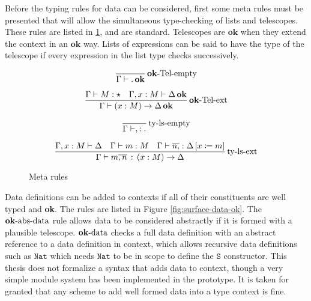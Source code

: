 Before the typing rules for data can be considered, first some meta rules must be presented that will allow the simultaneous type-checking of lists and telescopes.
These rules are listed in \ref{fig:surface-data-meta-ty}, and are standard.
Telescopes are $\mathbf{ok}$ when they extend the context in an $\mathbf{ok}$ way.
Lists of expressions can be said to have the type of the telescope if every expression in the list type checks successively.

\begin{figure}
\[
\frac{
  \,
  }{\Gamma\vdash.\,\mathbf{ok}}\operatorname{\mathbf{ok}-Tel-empty}
\]

\[
\frac{
  \Gamma\vdash M:\star\quad\Gamma,x:M\vdash\Delta\,\mathbf{ok}
  }{\Gamma\vdash\left(x:M\right)\rightarrow\Delta\,\mathbf{ok}}\operatorname{\mathbf{ok}-Tel-ext}
\]

\[
\frac{
  \,
}{\Gamma\vdash,:.}\operatorname{ty-ls-empty}
\]

\[
\frac{
  \Gamma,x:M\vdash\Delta\quad\Gamma\vdash m:M\quad\Gamma\vdash\overline{n,} %
  :\Delta\left[x\coloneqq m\right]
  }{\Gamma\vdash m\overline{,n}\,:\,\left(x:M\right)\rightarrow\Delta}\rulename{ty-ls-ext}
\]

\caption{Meta rules}
\label{fig:surface-data-meta-ty}
\end{figure}

Data definitions can be added to contexts if all of their constituents are well typed and \textbf{ok}.
The rules are listed in Figure \ref{fig:surface-data-ok}.
The $\operatorname{\mathbf{ok}-abs-data}$ rule allows data to be considered abstractly if it is formed with a plausible telescope.
$\operatorname{\mathbf{ok}-data}$ checks a full data definition with an abstract reference to a data definition in context, which allows recursive data definitions such as $\mathtt{Nat}$ which needs $\mathtt{Nat}$ to be in scope to define the $\mathtt{S}$ constructor.
This thesis does not formalize a syntax that adds data to context, though a very simple module system has been implemented in the prototype.
It is taken for granted that any scheme to add well formed data into a type context is fine.

